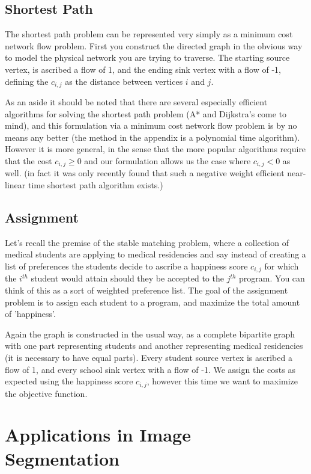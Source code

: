 \documentclass[12pt]{amsart}
\begin{document}
\subsection{Shortest Path}
The shortest path problem can be represented very simply as a minimum cost network flow problem. First you construct the directed graph in the obvious way to model the physical network you are trying to traverse. The starting source vertex, is ascribed a flow of 1, and the ending sink vertex with a flow of -1, defining the $c_{i, j}$ as the distance between vertices $i$ and $j$. 

As an aside it should be noted that there are several especially efficient algorithms for solving the shortest path problem (A* and Dijkstra's come to mind), and this formulation via a minimum cost network flow problem is by no means any better (the method in the appendix is a polynomial time algorithm). However it is more general, in the sense that the more popular algorithms require that the cost $c_{i,j} \geq 0$ and our formulation allows us the case where $c_{i, j} < 0$ as well. (in fact it was only recently found that such a negative weight efficient near-linear time shortest path algorithm exists.)  


\subsection{Assignment} 
Let's recall the premise of the stable matching problem, where a collection of medical students are applying to medical residencies and say instead of creating a list of preferences the students decide to ascribe a happiness score $c_{i, j}$ for which the $i^{th}$ student would attain should they be accepted to the $j^{th}$ program. You can think of this as a sort of weighted preference list. The goal of the assignment problem is to assign each student to a program, and maximize the total amount of 'happiness'. 

Again the graph is constructed in the usual way, as a complete bipartite graph with one part representing students and another representing medical residencies (it is necessary to have equal parts). Every student source vertex is ascribed a flow of 1, and every school sink vertex with a flow of -1. We assign the costs as expected using the happiness score $c_{i, j}$, however this time we want to maximize the objective function. 



\section{Applications in Image Segmentation}
\end{document}
